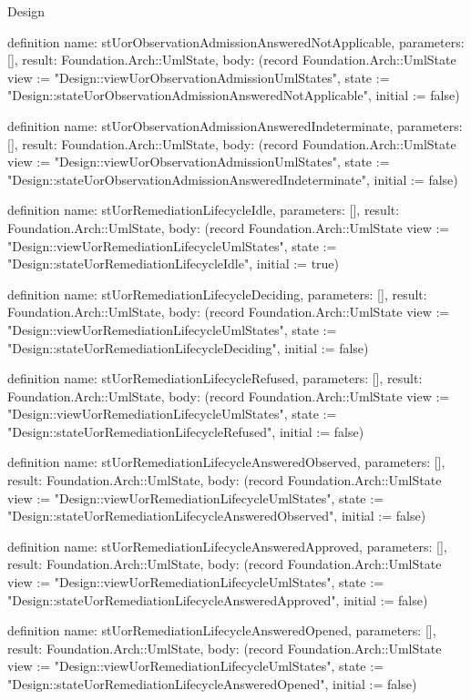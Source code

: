\begin{lexlean}{Design}
\begin{semanticmodule}
definition{
  name: stUorObservationAdmissionAnsweredNotApplicable,
  parameters: [],
  result: Foundation.Arch::UmlState,
  body: (record Foundation.Arch::UmlState {view := "Design::viewUorObservationAdmissionUmlStates", state := "Design::stateUorObservationAdmissionAnsweredNotApplicable", initial := false})
}

definition{
  name: stUorObservationAdmissionAnsweredIndeterminate,
  parameters: [],
  result: Foundation.Arch::UmlState,
  body: (record Foundation.Arch::UmlState {view := "Design::viewUorObservationAdmissionUmlStates", state := "Design::stateUorObservationAdmissionAnsweredIndeterminate", initial := false})
}

definition{
  name: stUorRemediationLifecycleIdle,
  parameters: [],
  result: Foundation.Arch::UmlState,
  body: (record Foundation.Arch::UmlState {view := "Design::viewUorRemediationLifecycleUmlStates", state := "Design::stateUorRemediationLifecycleIdle", initial := true})
}

definition{
  name: stUorRemediationLifecycleDeciding,
  parameters: [],
  result: Foundation.Arch::UmlState,
  body: (record Foundation.Arch::UmlState {view := "Design::viewUorRemediationLifecycleUmlStates", state := "Design::stateUorRemediationLifecycleDeciding", initial := false})
}

definition{
  name: stUorRemediationLifecycleRefused,
  parameters: [],
  result: Foundation.Arch::UmlState,
  body: (record Foundation.Arch::UmlState {view := "Design::viewUorRemediationLifecycleUmlStates", state := "Design::stateUorRemediationLifecycleRefused", initial := false})
}

definition{
  name: stUorRemediationLifecycleAnsweredObserved,
  parameters: [],
  result: Foundation.Arch::UmlState,
  body: (record Foundation.Arch::UmlState {view := "Design::viewUorRemediationLifecycleUmlStates", state := "Design::stateUorRemediationLifecycleAnsweredObserved", initial := false})
}

definition{
  name: stUorRemediationLifecycleAnsweredApproved,
  parameters: [],
  result: Foundation.Arch::UmlState,
  body: (record Foundation.Arch::UmlState {view := "Design::viewUorRemediationLifecycleUmlStates", state := "Design::stateUorRemediationLifecycleAnsweredApproved", initial := false})
}

definition{
  name: stUorRemediationLifecycleAnsweredOpened,
  parameters: [],
  result: Foundation.Arch::UmlState,
  body: (record Foundation.Arch::UmlState {view := "Design::viewUorRemediationLifecycleUmlStates", state := "Design::stateUorRemediationLifecycleAnsweredOpened", initial := false})
}


\end{semanticmodule}
\end{lexlean}
